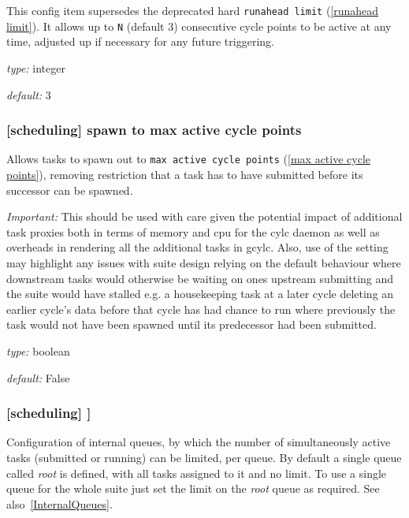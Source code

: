 This config item supersedes the deprecated hard \lstinline=runahead limit=
(\ref{runahead limit}). It allows up to \lstinline=N= (default 3) consecutive
cycle points to be active at any time, adjusted up if necessary for
any future triggering.

\begin{myitemize}
    \item {\em type:} integer
    \item {\em default:} 3
\end{myitemize}

\subsubsection[spawn to max active cycle points]{[scheduling] \textrightarrow
 spawn to max active cycle points}
\label{spawn to max active cycle points}

Allows tasks to spawn out to \lstinline=max active cycle points=
(\ref{max active cycle points}), removing restriction that a task has to have
submitted before its successor can be spawned.

{\em Important:} This should be used with care given the potential impact of
additional task proxies both in terms of memory and cpu for the cylc daemon as
well as overheads in rendering all the additional tasks in gcylc. Also, use
of the setting may highlight any issues with suite design relying on the
default behaviour where downstream tasks would otherwise be waiting on ones
upstream submitting and the suite would have stalled e.g. a housekeeping task
at a later cycle deleting an earlier cycle's data before that cycle has had
chance to run where previously the task would not have been spawned until its
predecessor had been submitted.

\begin{myitemize}
    \item {\em type:} boolean
    \item {\em default:} False
\end{myitemize}

\subsubsection[{[[}queues{]]}]{[scheduling] \textrightarrow [[queues]]}

Configuration of internal queues, by which the number of simultaneously
active tasks (submitted or running) can be limited, per queue. By
default a single queue called {\em root} is defined, with all tasks
assigned to it and no limit. To use a single queue for the whole suite
just set the limit on the {\em root} queue as required.
See also~\ref{InternalQueues}.

